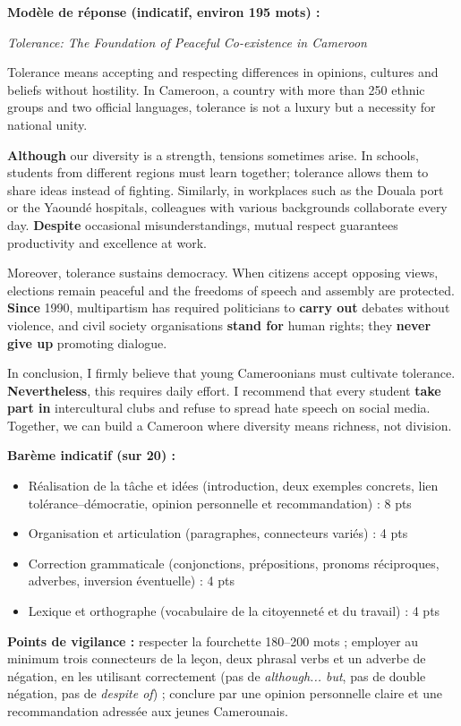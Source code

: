 \documentclass[11pt]{article}
\begin{document}
\begin{corrige}
\textbf{Modèle de réponse (indicatif, environ 195 mots) :}

\emph{Tolerance: The Foundation of Peaceful Co-existence in Cameroon}

Tolerance means accepting and respecting differences in opinions, cultures and beliefs without hostility. In Cameroon, a country with more than 250 ethnic groups and two official languages, tolerance is not a luxury but a necessity for national unity.

\textbf{Although} our diversity is a strength, tensions sometimes arise. In schools, students from different regions must learn together; tolerance allows them to share ideas instead of fighting. Similarly, in workplaces such as the Douala port or the Yaoundé hospitals, colleagues with various backgrounds collaborate every day. \textbf{Despite} occasional misunderstandings, mutual respect guarantees productivity and excellence at work.

Moreover, tolerance sustains democracy. When citizens accept opposing views, elections remain peaceful and the freedoms of speech and assembly are protected. \textbf{Since} 1990, multipartism has required politicians to \textbf{carry out} debates without violence, and civil society organisations \textbf{stand for} human rights; they \textbf{never} \textbf{give up} promoting dialogue.

In conclusion, I firmly believe that young Cameroonians must cultivate tolerance. \textbf{Nevertheless}, this requires daily effort. I recommend that every student \textbf{take part in} intercultural clubs and refuse to spread hate speech on social media. Together, we can build a Cameroon where diversity means richness, not division.

\textbf{Barème indicatif (sur 20) :}
\begin{itemize}
\item Réalisation de la tâche et idées (introduction, deux exemples concrets, lien tolérance--démocratie, opinion personnelle et recommandation) : 8 pts
\item Organisation et articulation (paragraphes, connecteurs variés) : 4 pts
\item Correction grammaticale (conjonctions, prépositions, pronoms réciproques, adverbes, inversion éventuelle) : 4 pts
\item Lexique et orthographe (vocabulaire de la citoyenneté et du travail) : 4 pts
\end{itemize}
\textbf{Points de vigilance :} respecter la fourchette 180--200 mots ; employer au minimum trois connecteurs de la leçon, deux phrasal verbs et un adverbe de négation, en les utilisant correctement (pas de \emph{although... but}, pas de double négation, pas de \emph{despite of}) ; conclure par une opinion personnelle claire et une recommandation adressée aux jeunes Camerounais.
\end{corrige}
\end{document}
